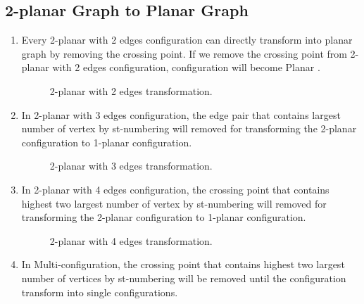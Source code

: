 \subsection{2-planar Graph to Planar Graph}
\label{2pgtpg}
\begin{enumerate}



\item Every 2-planar with 2 edges configuration can directly transform into planar graph by removing the crossing point. If we remove the crossing point from 2-planar with 2 edges configuration, configuration will become Planar .




\begin{figure}[!tb]
\centering
\resizebox{50mm}{!}{}
\caption{2-planar with 2 edges transformation.}
\label{fig:2planar2edges}
\end{figure}

\item 
In 2-planar with 3 edges configuration, the edge pair that contains largest number of vertex by st-numbering will removed for transforming the 2-planar configuration to 1-planar configuration.



\begin{figure}[!tb]
\centering
\resizebox{150mm}{!}{}
\caption{2-planar with 3 edges transformation.}
\label{fig:2planar3edges}
\end{figure}


\item In 2-planar with 4 edges configuration, the crossing point that contains highest two largest number of vertex by st-numbering will removed for transforming the 2-planar configuration to 1-planar configuration.



\begin{figure}[!tb]
\centering
\resizebox{150mm}{!}{}
\caption{2-planar with 4 edges transformation.}
\label{fig:2planar4edges}
\end{figure}


\item 
In Multi-configuration, the crossing point that contains highest two largest number of vertices by st-numbering will be removed until the configuration transform into single configurations.


\end{enumerate}
